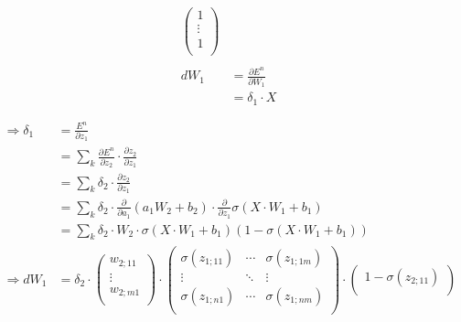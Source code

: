 \begin{align*}
\begin{pmatrix}
                                                                            1 \\
                                                                            \vdots \\
                                                                            1  \\
                                                                            \end{pmatrix} \\\\
    dW_{1} &= \frac{\partial E^{n}}{\partial W_{1}}\\
    &= \delta_{1} \cdot X\\\\
\end{align*}
\begin{align*}    
    \Rightarrow \delta_{1} &= \frac{E^{n}}{\partial z_{1}}\\
    &= \sum_{k} \frac{\partial E^{n}}{\partial z_{2}}\cdot \frac{\partial z_{2}}{\partial z_{1}}\\
    &= \sum_{k} \delta_{2} \cdot \frac{\partial z_{2}}{\partial z_{1}}\\
    &= \sum_{k} \delta_{2}\cdot \frac{\partial }{\partial a_{1}}(a_{1}W_{2}+b_{2})\cdot \frac{\partial }{\partial z_{1}}\sigma(X\cdot W_{1} +b_{1})\\
    &= \sum_{k} \delta_{2}\cdot W_{2} \cdot \sigma(X\cdot W_{1}+b_{1})(1- \sigma(X\cdot W_{1}+b_{1}))\\
    \Rightarrow dW_{1}&= \delta_{2} \cdot \begin{pmatrix}
                        w_{2;11} \\
                        \vdots \\
                        w_{2;m1} \\
                        \end{pmatrix} \cdot \begin{pmatrix}
                                            \sigma (z_{1;11})& \cdots & \sigma(z_{1;1m}) \\
                                            \vdots & \ddots &\vdots\\
                                            \sigma (z_{1;n1}) & \cdots & \sigma (z_{1;nm})  \\
                                            \end{pmatrix} \cdot \begin{pmatrix}
                                                                1-\sigma (z_{2;11}) \\

\end{pmatrix}
\end{align*}
